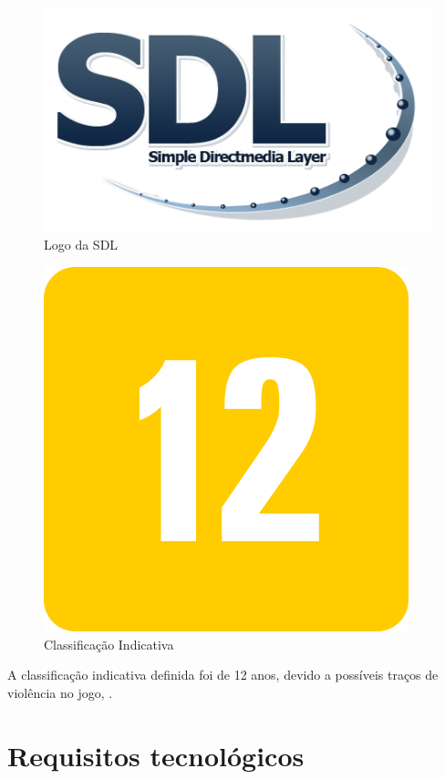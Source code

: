 \documentclass[11pt]{article} %
\begin{document}
\begin{figure}[!htp]
\centering
\includegraphics[scale=0.3]{res/Sdl-logo.png}
\caption{Logo da SDL}
\label{Logo da SDL}
\end{figure}

\begin{figure}[!htp]
\centering
\includegraphics[scale=0.3]{res/classification.png}
\caption{Classificação Indicativa}
\label{Classificação Indicativa}
\end{figure}

A classificação indicativa definida foi de 12 anos, devido a possíveis traços de violência no jogo, . 


\newpage

\section{Requisitos tecnológicos}
\end{document}
